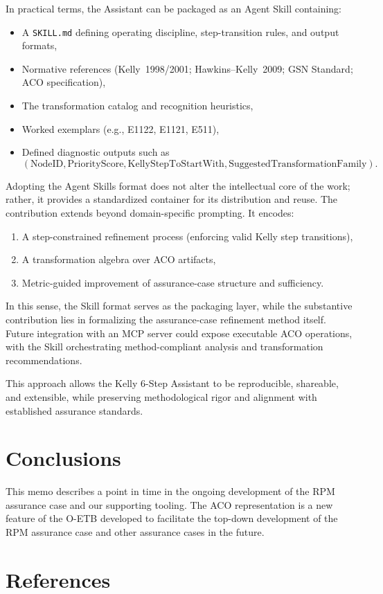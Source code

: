 \documentclass{article}
\begin{document}
In practical terms, the Assistant can be packaged as an Agent Skill containing:

\begin{itemize}
  \item A \texttt{SKILL.md} defining operating discipline, step-transition rules, and output formats,
  \item Normative references (Kelly~1998/2001; Hawkins--Kelly~2009; GSN Standard; ACO specification),
  \item The transformation catalog and recognition heuristics,
  \item Worked exemplars (e.g., E1122, E1121, E511),
  \item Defined diagnostic outputs such as
  \[
    (\text{NodeID}, \text{PriorityScore}, \text{KellyStepToStartWith}, \text{SuggestedTransformationFamily}).
  \]
\end{itemize}

Adopting the Agent Skills format does not alter the intellectual core of the work; rather, it provides a standardized container for its distribution and reuse. The contribution extends beyond domain-specific prompting. It encodes:

\begin{enumerate}
  \item A step-constrained refinement process (enforcing valid Kelly step transitions),
  \item A transformation algebra over ACO artifacts,
  \item Metric-guided improvement of assurance-case structure and sufficiency.
\end{enumerate}

In this sense, the Skill format serves as the packaging layer, while the substantive contribution lies in formalizing the assurance-case refinement method itself. Future integration with an MCP server could expose executable ACO operations, with the Skill orchestrating method-compliant analysis and transformation recommendations.

This approach allows the Kelly 6-Step Assistant to be reproducible, shareable, and extensible, while preserving methodological rigor and alignment with established assurance standards.

\clearpage
\section{Conclusions}\label{sed:concl}
This memo describes a point in time in the ongoing development of the RPM assurance case and our supporting tooling.
The ACO representation is a new feature of the O-ETB developed to facilitate the top-down development of the RPM assurance case and other assurance cases in the future.

\clearpage
\section{References}\label{sec:refs}
\end{document}
